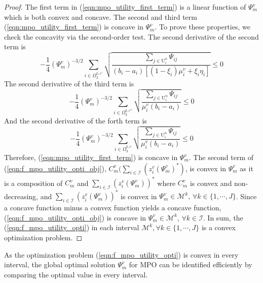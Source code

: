 \documentclass[10pt,journal, compsoc]{IEEEtran}
\begin{document}
\begin{proof}
The first term in (\ref{eqn:mpo_utility_first_term}) is a linear function of $\Psi_m^v$ which is both convex and concave. The second and third term (\ref{eqn:mpo_utility_first_term}) is concave in $\Psi_m^v$. To prove these properties, we check the concavity via the second-order test. The second derivative of the second term is
\begin{equation}
-\frac{1}{4}(\Psi_m^v)^{-3/2}\sum_{i \in \Omega_2^{k,e'}} \sqrt{\frac{\sum_{j \in \mathrm{U}_i^n}\Psi_{ij}}{(b_i-a_i)[(1-\xi_i)\mu_i^v + \xi_i \eta_i]}} \leq 0
\end{equation}
The second derivative of the third term is
\begin{equation}
-\frac{1}{4}(\Psi_m^v)^{-3/2}\sum_{i \in \Omega_2^{k,e''}} \sqrt{\frac{\sum_{j \in \mathrm{U}_i^n}\Psi_{ij}}{\mu_i^v(b_i-a_i)}} \leq 0
\end{equation}
And the second derivative of the forth term is
\begin{equation}
-\frac{1}{4}(\Psi_m^v)^{-3/2}\sum_{i \in \Omega_3^{k,e}} \sqrt{\frac{\sum_{j \in \mathrm{U}_i^n}\Psi_{ij}}{\mu_i^v(b_i-a_i)}} \leq 0
\end{equation}
Therefore, (\ref{eqn:mpo_utility_first_term}) is concave in $\Psi_m^v$. The second term of (\ref{eqn:f_mpo_utility_opti_obj}), $C_m^v\big(\sum_{i \in \mathcal{I}} (z_{i}^v(\Psi_m^v)^*)$, is convex in $\Psi_m^v$ as it is a composition of $C_m^v$ and $\sum_{i \in \mathcal{I}} (z_{i}^v(\Psi_m^v))^*$ where $C_m^v$ is convex and non-decreasing, and $\sum_{i \in \mathcal{I}} (z_{i}^v(\Psi_m^v))^*$ is convex in $\Psi_m^v \in \mathcal{M}^k,\, \forall k \in \{1, \cdots, J\}$. Since a concave function minus a convex function yields a concave function, (\ref{eqn:f_mpo_utility_opti_obj}) is concave in $\Psi_m^v \in \mathcal{M}^k,\, \forall k \in \mathcal{I}$. In sum, the (\ref{eqn:f_mpo_utility_opti}) in each interval $\mathcal{M}^k, \forall k \in \{1, \cdots, J\}$ is a convex optimization problem. \qedhere
\end{proof}
As the optimization problem (\ref{eqn:f_mpo_utility_opti}) is convex in every interval, the global optimal solution $\Psi_m^v$ for MPO can be identified efficiently by comparing the optimal value in every interval.
\end{document}

